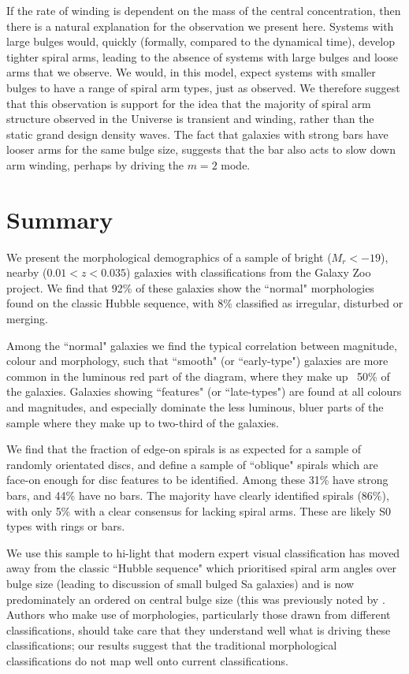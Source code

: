 \documentclass[usenatbib]{mn2e}
\begin{document}
If the rate of winding is dependent on the mass of the central concentration, then there is a natural explanation for the observation we present here. Systems with large bulges would, quickly (formally, compared to the dynamical time), develop tighter spiral arms, leading to the absence of systems with large bulges and loose arms that we observe. We would, in this model, expect systems with smaller bulges to have a range of spiral arm types, just as observed. We therefore suggest that this observation is support for the idea that the majority of spiral arm structure observed in the Universe is transient and winding, rather than the static grand design density waves. The fact that galaxies with strong bars have looser arms for the same bulge size, suggests that the bar also acts to slow down arm winding, perhaps by driving the $m=2$ mode. 

\section{Summary}

We present the morphological demographics of a sample of bright ($M_r <-19$), nearby ($0.01<z<0.035$) galaxies with classifications from the Galaxy Zoo project. We find that {92\%} of these galaxies show the ``normal" morphologies found on the classic Hubble sequence, with {8\%} classified as irregular, disturbed or merging. 

Among the ``normal" galaxies we find the typical correlation between magnitude, colour and morphology, such that ``smooth" (or ``early-type") galaxies are more common in the luminous red part of the diagram, where they make up ~50\% of the galaxies. Galaxies showing ``features" (or ``late-types") are found at all colours and magnitudes, and especially dominate the less luminous, bluer parts of the sample where they make up to two-third of the galaxies. 

 We find that the fraction of edge-on spirals is as expected for a sample of randomly orientated discs, and define a sample of ``oblique" spirals which are face-on enough for disc features to be identified. Among these {31\%} have strong bars, and {44\%} have no bars. The majority have clearly identified spirals ({86\%}), with only {5\%} with a clear consensus for lacking spiral arms. These are likely S0 types with rings or bars. 
 
 We use this sample to hi-light that modern expert visual classification has moved away from the classic ``Hubble sequence" which prioritised spiral arm angles over bulge size (leading to discussion of small bulged Sa galaxies) and is now predominately an ordered on central bulge size (this was previously noted by \citet{Willett2013}. Authors who make use of morphologies, particularly those drawn from different classifications, should take care that they understand well what is driving these classifications; our results suggest that the traditional morphological classifications do not map well onto current classifications. 
\end{document}
